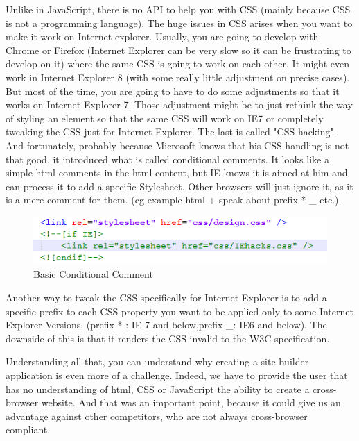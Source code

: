 Unlike in JavaScript, there is no API to help you with CSS (mainly because CSS is not a programming language). The huge issues in CSS arises when you want to make it work on Internet explorer. Usually, you are going to develop with Chrome or Firefox (Internet Explorer can be very slow so it can be frustrating to develop on it) where the same CSS is going to work on each other. It might even work in Internet Explorer 8 (with some really little adjustment on precise cases). But most of the time, you are going to have to do some adjustments so that it works on Internet Explorer 7. Those adjustment might be to just rethink the way of styling an element so that the same CSS will work on IE7 or completely tweaking the CSS just for Internet Explorer.
The last is called "CSS hacking". And fortunately, probably because Microsoft knows that his CSS handling is not that good, it introduced what is called conditional comments. It looks like a simple html comments in the html content, but IE knows it is aimed at him and can process it to add a specific Stylesheet. Other browsers will just ignore it, as it is a mere comment for them. (cg example html + speak about prefix * \_ etc.). 
\begin{figure}[!r]
\centering
\includegraphics[width=.55\textwidth]{img/comments.png}
\caption{Basic Conditional Comment}
\label{figure:conditional comment}
\end{figure}
Another way to tweak the CSS specifically for Internet Explorer is to add a specific prefix to each CSS property you want to be applied only to some Internet Explorer Versions. (prefix * : IE 7 and below,prefix \_: IE6 and below). The downside of this is that it renders the CSS invalid to the W3C specification.

Understanding all that, you can understand why creating a site builder application is even more of a challenge. Indeed, we have to provide the user that has no understanding of html, CSS or JavaScript the ability to create a cross-browser website. And that was an important point, because it could give us an advantage against other competitors, who are not always cross-browser compliant.

